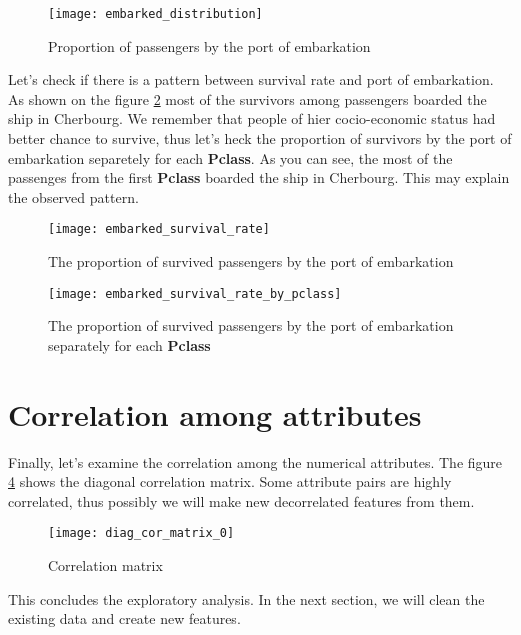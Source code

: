 \begin{figure}[!hp]
    \centering
    \texttt{[image: embarked\_distribution]}
    \caption{Proportion of passengers by the port of embarkation}
    \label{pic:embarked_distribution}
\end{figure}

Let's check if there is a pattern between survival rate and port of embarkation.
As shown on the figure \ref{pic:embarked_survival_rate} most of the survivors
among passengers boarded the ship in Cherbourg. We remember that people of 
hier cocio-economic status had better chance to survive, thus let's heck the
proportion of survivors by the port of embarkation separetely for each 
\textbf{Pclass}. As you can see, the most of the passenges from the first
\textbf{Pclass} boarded the ship in Cherbourg. This may explain the observed 
pattern.

\begin{figure}[!hp]
    \centering
    \texttt{[image: embarked\_survival\_rate]}
    \caption{The proportion of survived passengers by the port of embarkation}
    \label{pic:embarked_survival_rate}
\end{figure}

\begin{figure}[!hp]
    \centering
    \texttt{[image: embarked\_survival\_rate\_by\_pclass]}
    \caption{The proportion of survived passengers by the port of embarkation separately for each \textbf{Pclass}}
    \label{pic:embarked_survival_rate_by_pclass}
\end{figure}


\section{Correlation among attributes}
Finally, let's examine the correlation among the numerical attributes.
The figure \ref{pic:diag_cor_matrix_0} shows the diagonal correlation matrix.
Some attribute pairs are highly correlated, thus possibly we will make new 
decorrelated features from them.

\begin{figure}
    \centering
    \texttt{[image: diag\_cor\_matrix\_0]}
    \caption{Correlation matrix}
    \label{pic:diag_cor_matrix_0}
\end{figure}

This concludes the exploratory analysis. In the next section, we will clean 
the existing data and create new features.